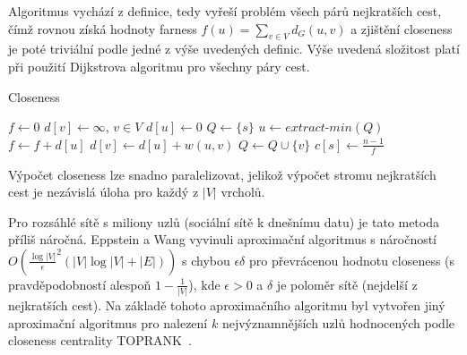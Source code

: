 \documentclass{bakalarka}
\begin{document}
Algoritmus vychází z definice, tedy vyřeší problém všech párů nejkratších cest,
čímž rovnou získá hodnoty farness $f(u) = \sum_{v \in V} d_G(u, v)$ a zjištění
closeness je poté triviální podle jedné z výše uvedených definic.  Výše uvedená
složitost platí při použití Dijkstrova algoritmu pro všechny páry cest.

\begin{center}
\begin{minipage}{\textwidth}
\begin{algorithm}[H]
	\caption{Closeness}
		\label{alg:closeness}

	\begin{algorithmic}[1]
	\Statex
		\State $f \gets 0$
		\State $d[v] \gets \infty$, $v \in V$
		\State $d[u] \gets 0$
		\State $Q \gets \{s\}$
			\State $u \gets extract\mbox{-}min(Q)$
			\State $f \gets f + d[u]$
					\State $d[v] \gets d[u] + w(u, v)$
					\State $Q \gets Q \cup \{v\}$
				\EndIf
			\EndFor
		\EndWhile
		\State $c[s] \gets \frac{n - 1}{f}$
	\EndFor
	\end{algorithmic}
\end{algorithm}
\end{minipage}
\end{center}
\mbox{}

Výpočet closeness lze snadno paralelizovat, jelikož výpočet stromu nejkratších
cest je nezávislá úloha pro každý z $|V|$ vrcholů.

Pro rozsáhlé sítě s miliony uzlů (sociální sítě k dnešnímu datu) je tato metoda
příliš náročná. Eppstein a Wang vyvinuli aproximační algoritmus s náročností
$O(\frac{\log|V|}{\epsilon}^2 (|V| \log |V| + |E|))$ s chybou $\epsilon \delta$
pro převrácenou hodnotu closeness (s pravděpodobností alespoň $1 -
\frac{1}{|V|}$), kde $\epsilon > 0$ a $\delta$ je poloměr sítě (nejdelší z
nejkratších cest). Na základě tohoto aproximačního algoritmu byl vytvořen jiný
aproximační algoritmus pro nalezení $k$ nejvýznamnějších uzlů hodnocených podle
closeness centrality TOPRANK~\citep{closenessapproximation}.
\end{document}
